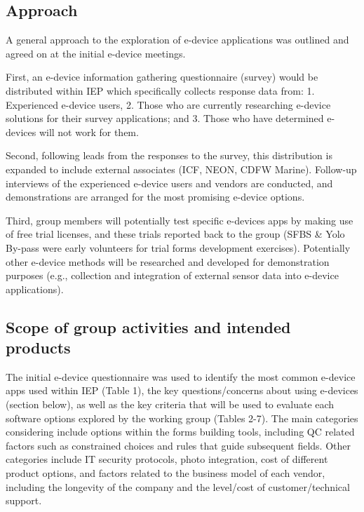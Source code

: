 \documentclass[
]{book}
\theoremstyle{definition}
\theoremstyle{definition}
\theoremstyle{definition}
\theoremstyle{definition}
\theoremstyle{remark}
\begin{document}
\hypertarget{approach}{%
\subsection{Approach}\label{approach}}

A general approach to the exploration of e-device applications was outlined and agreed on at the initial e-device meetings.

First, an e-device information gathering questionnaire (survey) would be distributed within IEP which specifically collects response data from: 1. Experienced e-device users, 2. Those who are currently researching e-device solutions for their survey applications; and 3. Those who have determined e-devices will not work for them.

Second, following leads from the responses to the survey, this distribution is expanded to include external associates (ICF, NEON, CDFW Marine). Follow-up interviews of the experienced e-device users and vendors are conducted, and demonstrations are arranged for the most promising e-device options.

Third, group members will potentially test specific e-devices apps by making use of free trial licenses, and these trials reported back to the group (SFBS \& Yolo By-pass were early volunteers for trial forms development exercises). Potentially other e-device methods will be researched and developed for demonstration purposes (e.g., collection and integration of external sensor data into e-device applications).

\hypertarget{scope-of-group-activities-and-intended-products}{%
\subsection{Scope of group activities and intended products}\label{scope-of-group-activities-and-intended-products}}

The initial e-device questionnaire was used to identify the most common e-device apps used within IEP (Table 1), the key questions/concerns about using e-devices (section below), as well as the key criteria that will be used to evaluate each software options explored by the working group (Tables 2-7). The main categories considering include options within the forms building tools, including QC related factors such as constrained choices and rules that guide subsequent fields. Other categories include IT security protocols, photo integration, cost of different product options, and factors related to the business model of each vendor, including the longevity of the company and the level/cost of customer/technical support.
\end{document}
